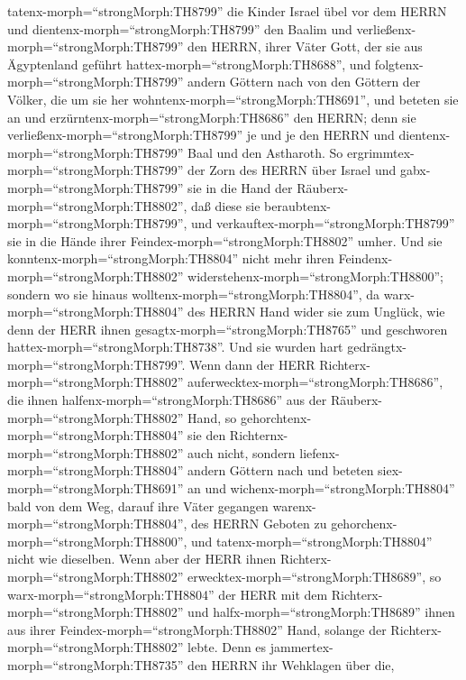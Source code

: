 tatenx-morph=``strongMorph:TH8799'' die Kinder Israel übel vor dem HERRN
und dientenx-morph=``strongMorph:TH8799'' den Baalim  und
verließenx-morph=``strongMorph:TH8799'' den HERRN, ihrer Väter Gott, der
sie aus Ägyptenland geführt hattex-morph=``strongMorph:TH8688'', und
folgtenx-morph=``strongMorph:TH8799'' andern Göttern nach von den
Göttern der Völker, die um sie her
wohntenx-morph=``strongMorph:TH8691'', und beteten sie an und
erzürntenx-morph=``strongMorph:TH8686'' den HERRN;  denn
sie verließenx-morph=``strongMorph:TH8799'' je und je den HERRN und
dientenx-morph=``strongMorph:TH8799'' Baal und den Astharoth.
 So ergrimmtex-morph=``strongMorph:TH8799'' der Zorn des
HERRN über Israel und gabx-morph=``strongMorph:TH8799'' sie in die Hand
der Räuberx-morph=``strongMorph:TH8802'', daß diese sie
beraubtenx-morph=``strongMorph:TH8799'', und
verkauftex-morph=``strongMorph:TH8799'' sie in die Hände ihrer
Feindex-morph=``strongMorph:TH8802'' umher. Und sie
konntenx-morph=``strongMorph:TH8804'' nicht mehr ihren
Feindenx-morph=``strongMorph:TH8802''
widerstehenx-morph=``strongMorph:TH8800'';  sondern wo sie
hinaus wolltenx-morph=``strongMorph:TH8804'', da
warx-morph=``strongMorph:TH8804'' des HERRN Hand wider sie zum Unglück,
wie denn der HERR ihnen gesagtx-morph=``strongMorph:TH8765'' und
geschworen hattex-morph=``strongMorph:TH8738''. Und sie wurden hart
gedrängtx-morph=``strongMorph:TH8799''.  Wenn dann der HERR
Richterx-morph=``strongMorph:TH8802''
auferwecktex-morph=``strongMorph:TH8686'', die ihnen
halfenx-morph=``strongMorph:TH8686'' aus der
Räuberx-morph=``strongMorph:TH8802'' Hand,  so
gehorchtenx-morph=``strongMorph:TH8804'' sie den
Richternx-morph=``strongMorph:TH8802'' auch nicht, sondern
liefenx-morph=``strongMorph:TH8804'' andern Göttern nach und beteten
siex-morph=``strongMorph:TH8691'' an und
wichenx-morph=``strongMorph:TH8804'' bald von dem Weg, darauf ihre Väter
gegangen warenx-morph=``strongMorph:TH8804'', des HERRN Geboten zu
gehorchenx-morph=``strongMorph:TH8800'', und
tatenx-morph=``strongMorph:TH8804'' nicht wie dieselben. 
Wenn aber der HERR ihnen Richterx-morph=``strongMorph:TH8802''
erwecktex-morph=``strongMorph:TH8689'', so
warx-morph=``strongMorph:TH8804'' der HERR mit dem
Richterx-morph=``strongMorph:TH8802'' und
halfx-morph=``strongMorph:TH8689'' ihnen aus ihrer
Feindex-morph=``strongMorph:TH8802'' Hand, solange der
Richterx-morph=``strongMorph:TH8802'' lebte. Denn es
jammertex-morph=``strongMorph:TH8735'' den HERRN ihr Wehklagen über die,
